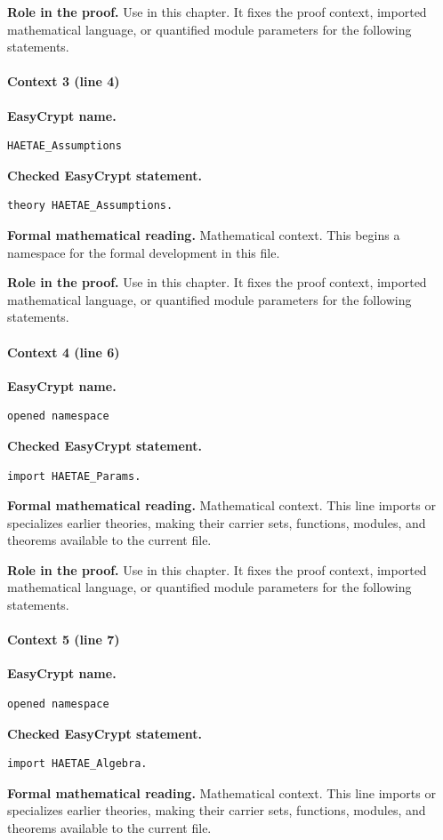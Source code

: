 \noindent\textbf{Role in the proof.}
Use in this chapter. It fixes the proof context, imported mathematical language, or quantified module parameters for the following statements.

\paragraph{Context 3 (line 4)}
\noindent\textbf{EasyCrypt name.}
\begin{lstlisting}[language=EasyCrypt,basicstyle=\ttfamily\scriptsize]
HAETAE_Assumptions
\end{lstlisting}
\noindent\textbf{Checked EasyCrypt statement.}
\begin{lstlisting}[language=EasyCrypt,basicstyle=\ttfamily\scriptsize]
theory HAETAE_Assumptions.
\end{lstlisting}
\noindent\textbf{Formal mathematical reading.}
Mathematical context. This begins a namespace for the formal development in this file.

\noindent\textbf{Role in the proof.}
Use in this chapter. It fixes the proof context, imported mathematical language, or quantified module parameters for the following statements.

\paragraph{Context 4 (line 6)}
\noindent\textbf{EasyCrypt name.}
\begin{lstlisting}[language=EasyCrypt,basicstyle=\ttfamily\scriptsize]
opened namespace
\end{lstlisting}
\noindent\textbf{Checked EasyCrypt statement.}
\begin{lstlisting}[language=EasyCrypt,basicstyle=\ttfamily\scriptsize]
import HAETAE_Params.
\end{lstlisting}
\noindent\textbf{Formal mathematical reading.}
Mathematical context. This line imports or specializes earlier theories, making their carrier sets, functions, modules, and theorems available to the current file.

\noindent\textbf{Role in the proof.}
Use in this chapter. It fixes the proof context, imported mathematical language, or quantified module parameters for the following statements.

\paragraph{Context 5 (line 7)}
\noindent\textbf{EasyCrypt name.}
\begin{lstlisting}[language=EasyCrypt,basicstyle=\ttfamily\scriptsize]
opened namespace
\end{lstlisting}
\noindent\textbf{Checked EasyCrypt statement.}
\begin{lstlisting}[language=EasyCrypt,basicstyle=\ttfamily\scriptsize]
import HAETAE_Algebra.
\end{lstlisting}
\noindent\textbf{Formal mathematical reading.}
Mathematical context. This line imports or specializes earlier theories, making their carrier sets, functions, modules, and theorems available to the current file.

